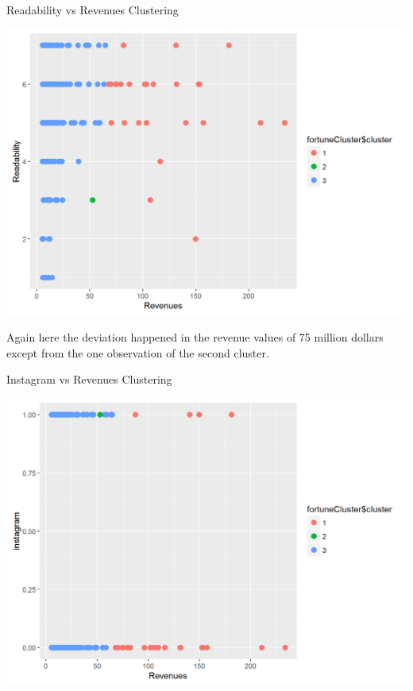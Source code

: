 \documentclass{book}
\begin{document}
\begin{table}[H]
\centering
\caption{Readability vs Revenues Clustering}
\begin{center}
\includegraphics[scale=0.5]{../R/photos/92_clust_read.png}   \\
\end{center}
\end{table}
Again here the deviation happened in the revenue values of 75 million dollars except from the one observation of the second cluster.
\begin{table}[H]
\centering
\caption{Instagram vs Revenues Clustering}
\begin{center}
\includegraphics[scale=0.5]{../R/photos/93_clust_inst.png}   \\
\end{center}
\end{table}
\end{document}
